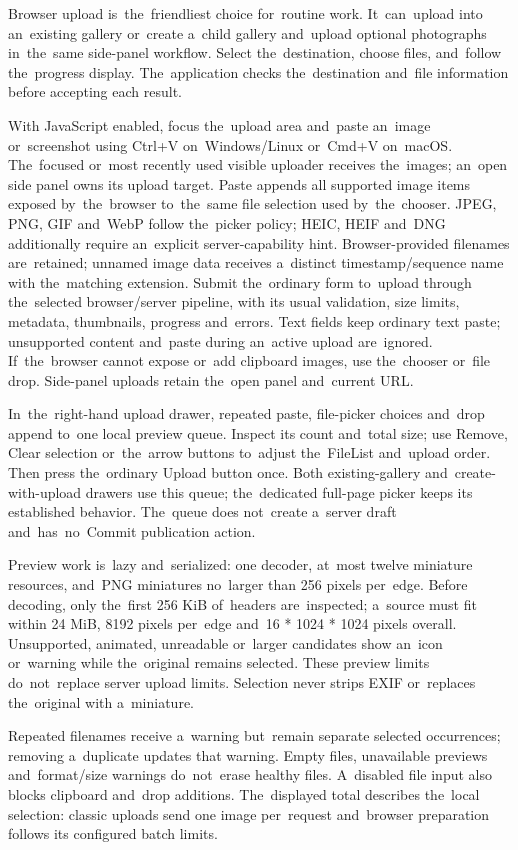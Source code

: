 \documentclass[11pt,a4paper]{article}
\begin{document}
Browser upload is~the~friendliest choice for~routine work. It~can~upload into
an~existing gallery or~create a~child gallery and~upload optional photographs
in~the~same side-panel workflow. Select the~destination, choose files,
and~follow the~progress display. The~application checks the~destination and~file
information before accepting each result.

With JavaScript enabled, focus the~upload area and~paste an~image or~screenshot
using Ctrl+V on~Windows/Linux or~Cmd+V on~macOS. The~focused or~most recently
used visible uploader receives the~images; an~open side panel owns its upload
target. Paste appends all supported image items exposed by~the~browser
to~the~same file selection used by~the~chooser. JPEG, PNG, GIF and~WebP follow
the~picker policy; HEIC, HEIF and~DNG additionally require an~explicit
server-capability hint. Browser-provided filenames are~retained; unnamed image
data receives a~distinct timestamp/sequence name with the~matching extension.
Submit the~ordinary form to~upload through the~selected browser/server pipeline,
with its usual validation, size limits, metadata, thumbnails, progress
and~errors. Text fields keep ordinary text paste; unsupported content and~paste
during an~active upload are~ignored. If~the~browser cannot expose or~add
clipboard images, use the~chooser or~file drop. Side-panel uploads retain
the~open panel and~current URL.

In~the~right-hand upload drawer, repeated paste, file-picker choices and~drop
append to~one local preview queue. Inspect its count and~total size; use Remove,
Clear selection or~the~arrow buttons to~adjust the~FileList and~upload order.
Then press the~ordinary Upload button once. Both existing-gallery
and~create-with-upload drawers use this queue; the~dedicated full-page picker
keeps its established behavior. The~queue does not~create a~server draft
and~has~no~Commit publication action.

Preview work is~lazy and~serialized: one decoder, at~most twelve miniature
resources, and~PNG miniatures no~larger than 256 pixels per~edge. Before
decoding, only the~first 256 KiB of~headers are~inspected; a~source must fit
within 24 MiB, 8192 pixels per~edge and~16 * 1024 * 1024 pixels overall.
Unsupported, animated, unreadable or~larger candidates show an~icon or~warning
while the~original remains selected. These preview limits do~not~replace server
upload limits. Selection never strips EXIF or~replaces the~original with
a~miniature.

Repeated filenames receive a~warning but~remain separate selected occurrences;
removing a~duplicate updates that warning. Empty files, unavailable previews
and~format/size warnings do~not~erase healthy files. A~disabled file input also
blocks clipboard and~drop additions. The~displayed total describes the~local
selection: classic uploads send one image per~request and~browser preparation
follows its configured batch limits.
\end{document}
